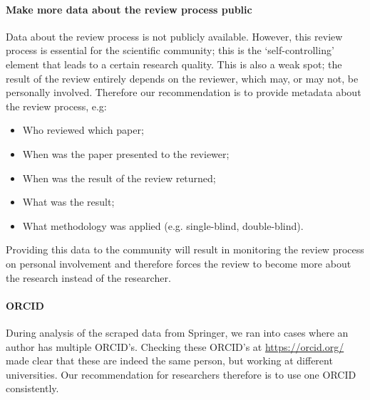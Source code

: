 \documentclass{ou-report}
\begin{document}
\paragraph{Make more data about the review process public}
Data about the review process is not publicly available. However, this review 
process is essential for the scientific community; this is the
`self-controlling’ element that leads to a certain research quality.
This is also a weak spot; the result of the review entirely depends on the 
reviewer, which may, or may not, be personally involved.
Therefore our recommendation is to provide metadata about the review process, 
e.g:
\begin{itemize}
    \item Who reviewed which paper;
    \item When was the paper presented to the reviewer;
    \item When was the result of the review returned;
    \item What was the result;
    \item What methodology was applied (e.g. single-blind, double-blind).
\end{itemize}

Providing this data to the community will result in monitoring the review 
process on personal involvement and therefore forces the review to become 
more about the research instead of the researcher.

\paragraph{ORCID}
During analysis of the scraped data from Springer, we ran into cases where an 
author has multiple ORCID's. Checking these ORCID's at \url{https://orcid.org/} 
made clear that these are indeed the same person, but working at different 
universities.
Our recommendation for researchers therefore is to use one ORCID consistently.


\end{document}
